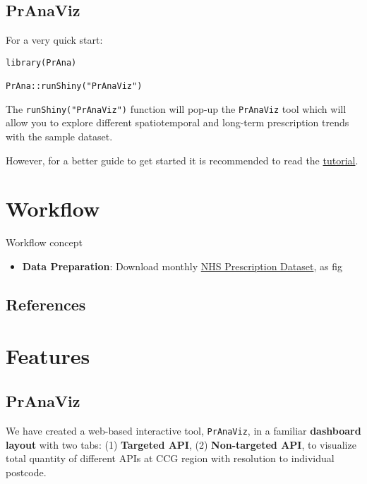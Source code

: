 \documentclass[
]{book}
\providecommand{\tightlist}{%
  \setlength{\itemsep}{0pt}\setlength{\parskip}{0pt}}
\begin{document}
\hypertarget{pranaviz}{%
\section{PrAnaViz}\label{pranaviz}}

For a very quick start:

\begin{verbatim}
library(PrAna)

PrAna::runShiny("PrAnaViz")
\end{verbatim}

The \texttt{runShiny("PrAnaViz")} function will pop-up the \texttt{PrAnaViz} tool which will allow you to explore different spatiotemporal and long-term prescription trends with the sample dataset.

However, for a better guide to get started it is recommended to read the \href{https://github.bath.ac.uk/pages/kjj28/PrAna/articles/PrAnaViz_Tutoral.html}{tutorial}.

\hypertarget{workflow}{%
\chapter{Workflow}\label{workflow}}

Workflow concept

\begin{itemize}
\tightlist
\item
  \textbf{Data Preparation}: Download monthly \href{https://applications.nhsbsa.nhs.uk/infosystems/welcome}{NHS Prescription Dataset}, as fig \citep{book}
\end{itemize}

\hypertarget{references}{%
\section{References}\label{references}}

\hypertarget{refs}{}

\hypertarget{features}{%
\chapter{Features}\label{features}}

\hypertarget{pranaviz-1}{%
\section{PrAnaViz}\label{pranaviz-1}}

We have created a web-based interactive tool, \texttt{PrAnaViz}, in a familiar \textbf{dashboard layout} with two tabs: (1) \textbf{Targeted API}, (2) \textbf{Non-targeted API}, to visualize total quantity of different APIs at CCG region with resolution to individual postcode.
\end{document}
